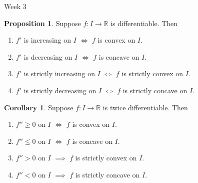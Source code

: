\documentclass[handout, dvipsnames]{beamer}
\theoremstyle{definition}
\newtheorem{prop}[thm]{Proposition}
\newtheorem{cor}[thm]{Corollary}
\begin{document}
\begin{frame}{Week 3}
    \begin{prop}
        Suppose $f: I \to \mathbb{R}$ is differentiable. Then
        \begin{enumerate}
            \item $f'$ is increasing on $I$ $\iff$ $f$ is convex on $I.$
            \item $f'$ is decreasing on $I$ $\iff$ $f$ is concave on $I.$
            \item $f'$ is strictly increasing on $I$ $\iff$ $f$ is strictly convex on $I.$
            \item $f'$ is strictly decreasing on $I$ $\iff$ $f$ is strictly concave on $I.$
        \end{enumerate}
    \end{prop}
    \begin{cor}
        Suppose $f: I \to \mathbb{R}$ is {\color{red}twice} differentiable. Then
        \begin{enumerate}
            \item $f''\ge 0$ on $I$ $\iff$ $f$ is convex on $I.$
            \item $f''\le 0$ on $I$ $\iff$ $f$ is concave on $I.$
            \item $f''> 0$ on $I$ $\implies$ $f$ is strictly convex on $I.$
            \item $f''< 0$ on $I$ $\implies$ $f$ is strictly concave on $I.$
        \end{enumerate}
    \end{cor}
\end{frame}
\end{document}
